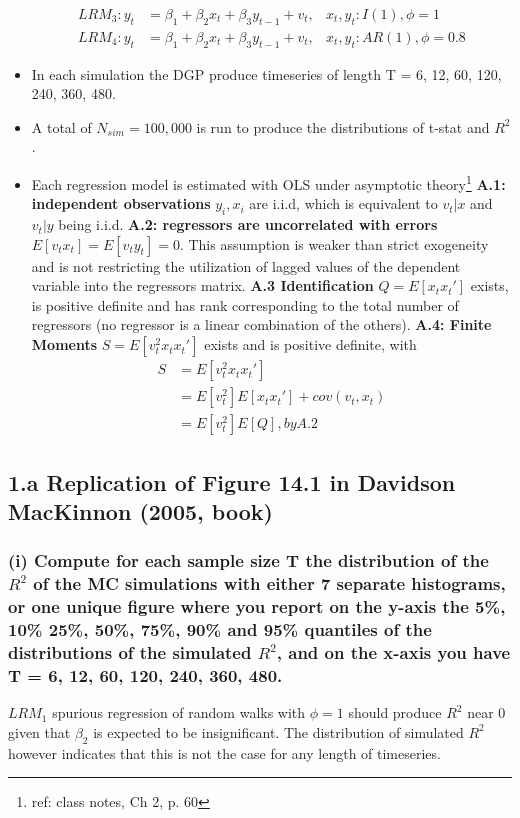 \documentclass[]{article}
\begin{document}
\begin{itemize}
\begin{align*}
		LRM_3: y_{t} &= \beta_{1} +\beta_{2}x_{t} + \beta_{3}y_{t-1} + v_{t}, &x_t, y_t: I(1), \phi=1\\
		LRM_4: y_{t} &= \beta_{1} +\beta_{2}x_{t} + \beta_{3}y_{t-1} + v_{t}, &x_t, y_t: AR(1), \phi=0.8
	\end{align*}	
	\item In each simulation the DGP produce timeseries of length T = 6, 12, 60, 120, 240, 360, 480.
	\item A total of $N_{sim} = 100,000$ is run to produce the distributions of t-stat and $R^2$.
	\item Each regression model is estimated with OLS under asymptotic theory\footnote{ref: class notes, Ch 2, p. 60}
	\subitem \textbf{A.1: independent observations} $y_i, x_i$ are i.i.d, which is equivalent to $v_t|x$ and $v_t|y$ being i.i.d.
	\subitem \textbf{A.2: regressors are uncorrelated with errors} $E[v_t x_t]=E[v_t y_t]=0$. This assumption is weaker than strict exogeneity and is not restricting the utilization of lagged values of the dependent variable into the regressors matrix.
	\subitem \textbf{A.3 Identification} $Q= E[x_{t}x_{t}']$ exists, is positive definite and has rank corresponding to the total number of regressors (no regressor is a linear combination of the others).
	\subitem \textbf{A.4: Finite Moments } $S = E[v_{t}^2x_{t}x_{t}']$ exists and is positive definite, with 
		\begin{align*}
			S &= E[v_{t}^2x_{t}x_{t}']\\
			&= E[v_t^2]E[x_tx_t']+cov(v_t,x_t)\\
			&= E[v_t^2]E[Q], by A.2
		\end{align*}
\end{itemize}

\newpage
\subsection*{1.a Replication of Figure 14.1 in Davidson MacKinnon (2005, book) }
\subsubsection*{(i) Compute for each sample size T the distribution of the $R^2$ of the MC simulations with either 7 separate histograms, or one unique figure where you report on the y-axis the 5\%, 10\% 25\%, 50\%, 75\%, 90\% and 95\% quantiles of the distributions of the simulated $R^2$, and on the x-axis you have T = 6, 12, 60, 120, 240, 360, 480.}

$LRM_1$ spurious regression of random walks with $\phi=1$ should produce $R^2$ near 0 given that $\beta_2$ is expected to be insignificant. The distribution of simulated $R^2$ however indicates that this is not the case for any length of timeseries. 
\end{document}

